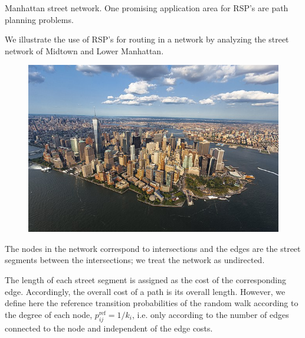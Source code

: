 \documentclass[13pt]{beamer}
\begin{document}
    \begin{frame}[t,allowframebreaks]{Manhattan street network.}
    One promising application area for RSP’s are path planning problems. %

    \vspace{0.8em}

    We illustrate the use of RSP’s for routing in a network by analyzing the street network of Midtown and Lower Manhattan.

    \begin{center}
    \begin{figure}
    \includegraphics[height=0.4\paperheight]{Images/man.jpg}
    \end{figure}
    \end{center}

    \newpage

    The nodes in the network correspond to intersections and the edges are the street segments between the intersections; we treat the network as undirected. 

    \vspace{0.8em}

    The length of each street segment is assigned as the cost of the corresponding edge. Accordingly, the overall
    cost of a path is its overall length. However, we define here the reference transition probabilities of the random
    walk according to the degree of each node, $p_{ij}^\text{ref}=1/k_i$, i.e. only according to the number of edges connected to the node and independent of the edge costs.


\end{frame}
\end{document}
